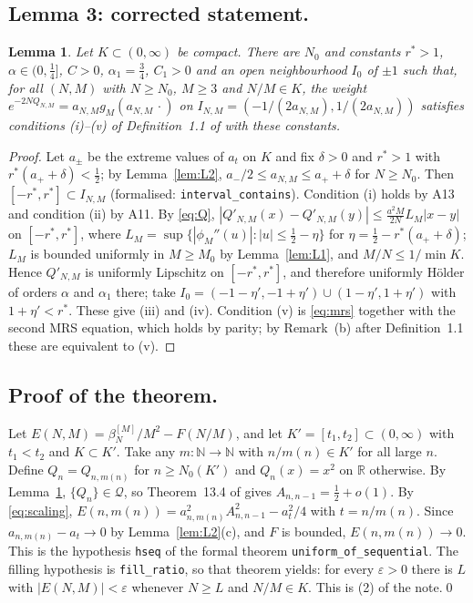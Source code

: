 \documentclass[11pt,a4paper]{article}
\newtheorem{lemma}{Lemma}
\theoremstyle{remark}
\newcommand{\R}{\mathbb R}
\newcommand{\N}{\mathbb N}
\newcommand{\Q}{\mathcal Q}
\numberwithin{equation}{section}
\begin{document}
\subsection{Lemma 3: corrected statement.}\label{sec:L3}

\begin{lemma}\label{lem:L3}
Let $K\subset(0,\infty)$ be compact. There are $N_0$ and constants $r^*>1$,
$\alpha\in(0,\frac14]$, $C>0$, $\alpha_1=\frac34$, $C_1>0$ and an open neighbourhood $I_0$ of
$\pm1$ such that, for all $(N,M)$ with $N\ge N_0$, $M\ge3$ and $N/M\in K$, the weight
$e^{-2NQ_{N,M}}=a_{N,M}g_M(a_{N,M}\,\cdot)$ on $I_{N,M}=(-1/(2a_{N,M}),1/(2a_{N,M}))$
satisfies conditions (i)--(v) of Definition~1.1 of \cite{levinlubinsky2018} with these
constants.
\end{lemma}

\begin{proof}
Let $a_\pm$ be the extreme values of $a_t$ on $K$ and fix $\delta>0$ and $r^*>1$ with
$r^*(a_++\delta)<\frac12$; by Lemma~\ref{lem:L2}, $a_-/2\le a_{N,M}\le a_++\delta$ for
$N\ge N_0$. Then $[-r^*,r^*]\subset I_{N,M}$ (formalised: \texttt{interval\_contains}).
Condition (i) holds by A13 and condition (ii) by A11. By \eqref{eq:Q},
$|Q'_{N,M}(x)-Q'_{N,M}(y)|\le\frac{a^2M}{2N}L_M|x-y|$ on $[-r^*,r^*]$, where
$L_M=\sup\{|\phi_M''(u)|:|u|\le\frac12-\eta\}$ for $\eta=\frac12-r^*(a_++\delta)$; $L_M$ is
bounded uniformly in $M\ge M_0$ by Lemma~\ref{lem:L1}, and $M/N\le1/\min K$. Hence $Q'_{N,M}$
is uniformly Lipschitz on $[-r^*,r^*]$, and therefore uniformly H\"older of orders
$\alpha$ and $\alpha_1$ there; take $I_0=(-1-\eta',-1+\eta')\cup(1-\eta',1+\eta')$ with
$1+\eta'<r^*$. These give (iii) and (iv). Condition (v) is \eqref{eq:mrs} together with
the second MRS equation, which holds by parity; by Remark~(b) after Definition~1.1 these are
equivalent to (v).
\end{proof}

\subsection{Proof of the theorem.}\label{sec:thm}

Let $E(N,M)=\beta_N^{[M]}/M^2-F(N/M)$, and let $K'=[t_1,t_2]\subset(0,\infty)$ with $t_1<t_2$
and $K\subset K'$. Take any $m:\N\to\N$ with $n/m(n)\in K'$ for all large $n$. Define
$Q_n=Q_{n,m(n)}$ for $n\ge N_0(K')$ and $Q_n(x)=x^2$ on $\R$ otherwise. By
Lemma~\ref{lem:L3}, $\{Q_n\}\in\Q$, so Theorem~13.4 of \cite{levinlubinsky2018} gives
$A_{n,n-1}=\frac12+o(1)$. By \eqref{eq:scaling}, $E(n,m(n))=a_{n,m(n)}^2A_{n,n-1}^2-a_{t}^2/4$
with $t=n/m(n)$. Since $a_{n,m(n)}-a_t\to0$ by Lemma~\ref{lem:L2}(c), and $F$ is bounded,
$E(n,m(n))\to0$. This is the hypothesis \texttt{hseq} of the formal theorem
\texttt{uniform\_of\_sequential}. The filling hypothesis is \texttt{fill\_ratio}, so that
theorem yields: for every $\varepsilon>0$ there is $L$ with $|E(N,M)|<\varepsilon$ whenever
$N\ge L$ and $N/M\in K$. This is (2) of the note.\qed
\end{document}
